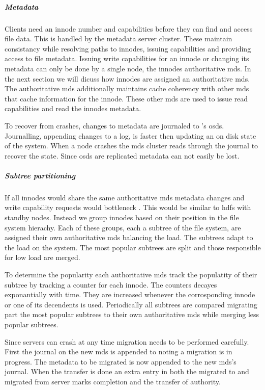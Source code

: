 \subparagraph{Metadata}
Clients need an innode number and capabilities before they can find and access file data. This is handled by the metadata server cluster. These maintain consistancy while resolving paths to innodes, issuing capabilities and providing access to file metadata. Issuing write capabilities for an innode or changing its metadata can only be done  by a single node, the innodes authoritative \ac{mds}. In the next section we will dicuss how innodes are assigned an authoritative \ac{mds}. The authoritative \ac{mds} additionally maintains cache coherency with other \ac{mds} that cache information for the innode. These other \ac{mds} are used to issue read capabilities and read the innodes metadata.

To recover from crashes, changes to metadata are journaled to \ceph{}'s \acfp{osd}. Journalling, appending changes to a log, is faster then updating an on disk state of the system. When a node crashes the \ac{mds} cluster reads through the journal to recover the state. Since \acp{osd} are replicated metadata can not easily be lost.

\subparagraph{Subtree partitioning}
If all innodes would share the same authoritative \ac{mds} metadata changes and write capability requests would bottleneck \ceph{}. This would be similar to \ac{hdfs} with standby nodes. Instead we group innodes based on their position in the file system hierachy. Each of these groups, each a subtree of the file system, are assigned their own authoritative \ac{mds} balancing the load. The subtrees adapt to the load on the system. The most popular subtrees are split and those responsible for low load are merged.

To determine the popularity each authoritative \ac{mds} track the populatity of their subtree by tracking a counter for each innode. The counters decayes exponantially with time. They are increased whenever the corrosponding innode or one of its decendents is used. Periodically all subtrees are compared migrating part the most popular subtrees to their own authoritative \ac{mds} while merging less popular subtrees.

Since servers can crash at any time migration needs to be performed carefully. First the journal on the new \ac{mds} is appended to noting a migration is in progress. The metadata to be migrated is now appended to the new \ac{mds}'s journal. When the transfer is done an extra entry in both the migrated to and migrated from server marks completion and the transfer of authority. 
